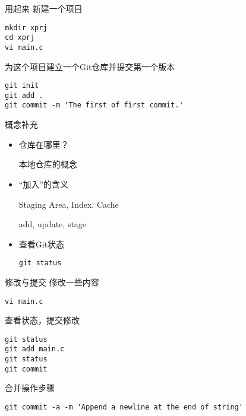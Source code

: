 \begin{frame}[<+->][fragile]{用起来}
\onslide<+->
新建一个项目
\begin{Verbatim}[frame=single,commandchars=\\\{\}]
mkdir xprj
cd xprj
vi main.c
\end{Verbatim}

\onslide<+->
为这个项目建立一个Git仓库并提交第一个版本
\begin{Verbatim}[frame=single,commandchars=\\\{\}]
git init
git add .
git commit -m 'The first of first commit.'
\end{Verbatim}
\end{frame}

\begin{frame}[<+->][fragile]{概念补充}
  \begin{itemize}
    \item 仓库在哪里？

    本地仓库的概念
    \item “加入”的含义

    Staging Area, Index, Cache 

    add, update, stage
    \item 查看Git状态
\begin{Verbatim}[frame=single,commandchars=\\\{\}]
git status
\end{Verbatim}

  \end{itemize}
\end{frame}


\begin{frame}[<+->][fragile]{修改与提交}
\onslide<+->
修改一些内容
\begin{Verbatim}[frame=single,commandchars=\\\{\}]
vi main.c
\end{Verbatim}

\onslide<+->
查看状态，提交修改
\begin{Verbatim}[frame=single,commandchars=\\\{\}]
git status
git add main.c
git status
git commit
\end{Verbatim}

\onslide<+->
合并操作步骤
\begin{Verbatim}[frame=single,commandchars=\\\{\}]
git commit -a -m 'Append a newline at the end of string'
\end{Verbatim}
\end{frame}

